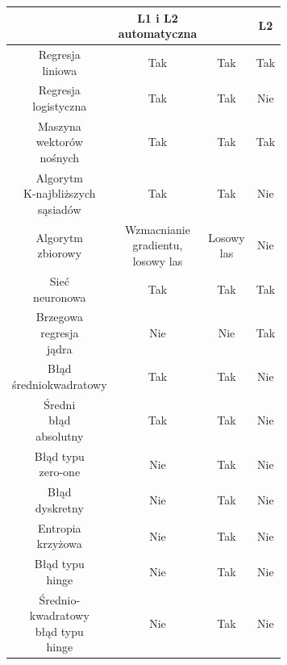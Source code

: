 \begin{longtable}{c | c | c | c}
	\hline
	\makecell{Regularyzacja} & \makecell{L1 i L2 \\ automatyczna} & \makecell{L1 i L2} & L2 \\
	\hline
	\makecell{Regresja \\ liniowa} & Tak & Tak & Tak \\
	\hline
	\makecell{Regresja \\ logistyczna} & Tak & Tak & Nie \\
	\hline
	\makecell{Maszyna \\ wektorów \\ nośnych} & Tak & Tak & Tak \\
	\hline
	\makecell{Algorytm \\ K-najbliższych \\ sąsiadów} & Tak & Tak & Nie \\
	\hline
	\makecell{Algorytm \\ zbiorowy} & \makecell{Wzmacnianie \\ gradientu, \\ losowy las} & \makecell{Losowy \\ las} & Nie \\
	\hline
	\makecell{Sieć \\ neuronowa} & Tak & Tak & Tak \\
	\hline
	\makecell{Brzegowa \\ regresja \\ jądra} & Nie & Nie & Tak \\
	\hline
	\makecell{Błąd \\ średniokwadratowy} & Tak & Tak & Nie \\
	\hline
	\makecell{Średni \\ błąd \\ absolutny} & Tak & Tak & Nie \\
	\hline
	\makecell{Błąd typu \\ zero-one} & Nie & Tak & Nie \\
	\hline
	\makecell{Błąd \\ dyskretny} & Nie & Tak & Nie \\
	\hline
	\makecell{Entropia \\ krzyżowa} & Nie & Tak & Nie \\
	\hline
	\makecell{Błąd typu \\ hinge} & Nie & Tak & Nie \\
	\hline
	\makecell{Średnio-\\kwadratowy \\ błąd typu \\ hinge} & Nie & Tak & Nie\\

\end{longtable}
